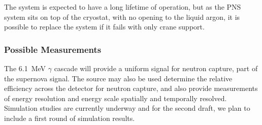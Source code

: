 The system is expected to have a long lifetime of operation, but as the PNS system sits on top of the cryostat, with no opening to the liquid argon, it is possible to replace the system if it fails with only crane support.


\subsubsection{Possible Measurements}
\label{sec:sp-calib-sys-pns-meas}

The 6.1~MeV $\gamma$ cascade will provide a uniform signal for neutron capture, part of the supernova signal. The source may also be used determine the relative efficiency across the detector for neutron capture, and also provide measurements of energy resolution and energy scale spatially and temporally resolved. Simulation studies are currently underway and for the second draft, we plan to include a first round of simulation results.






